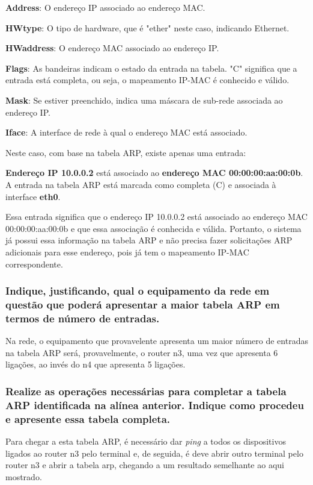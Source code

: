 \textbf{Address}: O endereço IP associado ao endereço MAC.

\textbf{HWtype}: O tipo de hardware, que é "ether" neste caso, indicando Ethernet.

\textbf{HWaddress}: O endereço MAC associado ao endereço IP.

\textbf{Flags}: As bandeiras indicam o estado da entrada na tabela. "C" significa que a entrada está completa, ou seja, o mapeamento IP-MAC é conhecido e válido.

\textbf{Mask}: Se estiver preenchido, indica uma máscara de sub-rede associada ao endereço IP.

\textbf{Iface}: A interface de rede à qual o endereço MAC está associado.\newline

Neste caso, com base na tabela ARP, existe apenas uma entrada:

\textbf{Endereço IP 10.0.0.2} está associado ao \textbf{endereço MAC 00:00:00:aa:00:0b}. A entrada na tabela ARP está marcada como completa (C) e associada à interface \textbf{eth0}.

Essa entrada significa que o endereço IP 10.0.0.2 está associado ao endereço MAC 00:00:00:aa:00:0b e que essa associação é conhecida e válida. Portanto, o sistema já possui essa informação na tabela ARP e não precisa fazer solicitações ARP adicionais para esse endereço, pois já tem o mapeamento IP-MAC correspondente.

\subsubsection{Indique, justificando, qual o equipamento da rede em questão que poderá apresentar a maior tabela ARP em termos de número de entradas.}

Na rede, o equipamento que provavelente apresenta um maior número de entradas na tabela ARP será, provavelmente, o router n3, uma vez que apresenta 6 ligações, ao invés do n4 que apresenta 5 ligações.

\subsubsection{Realize as operações necessárias para completar a tabela ARP identificada na alínea anterior. Indique como procedeu e apresente essa tabela completa.}

Para chegar a esta tabela ARP, é necessário dar \textit{ping} a todos os dispositivos ligados ao router n3 pelo terminal e, de seguida, é deve abrir outro terminal pelo router n3 e abrir a tabela arp, chegando a um resultado semelhante ao aqui mostrado.


